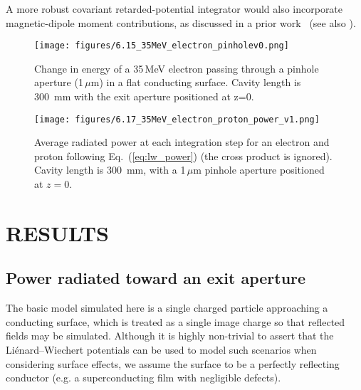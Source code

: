 \documentclass[reprint,
               amsmath,amssymb,nofootinbib, aps%
              ]{revtex4-2}
\begin{document}
A more robust covariant retarded-potential integrator would also incorporate magnetic-dipole moment contributions, as discussed in a prior work~\cite{folsom:ipac2021-tupab218} (see also \cite{steinmetzMagneticDipoleMoment2019a}).

\begin{figure}[ht!]
    \centering
    \texttt{[image: figures/6.15\_35MeV\_electron\_pinholev0.png]}
    \caption{Change in energy of a 35\,MeV electron passing through a pinhole aperture (1\,$\mu$m) in a flat conducting surface. Cavity length is 300~mm with the exit aperture positioned at z=0.}
\label{fig:e_dep_35_MeV_elec}
\end{figure}

\begin{figure}[ht!]
    \centering
    \texttt{[image: figures/6.17\_35MeV\_electron\_proton\_power\_v1.png]}
    \caption{Average radiated power at each integration step for an electron and proton following Eq.~(\ref{eq:lw_power}) (the cross product is ignored). Cavity length is 300~mm, with a 1\,$\mu$m pinhole aperture positioned at $z=0$.}
\label{fig:pow_dep_elec_prot}
\end{figure}

\vspace{-0.2cm}
\section{RESULTS} \label{results}
\vspace{-0.2cm}
\subsection{Power radiated toward an exit aperture}
The basic model simulated here is a single charged particle approaching a conducting surface, which is treated as a single image charge so that reflected fields may be simulated. Although it is highly non-trivial to assert that the Liénard--Wiechert potentials can be used to model such scenarios when considering surface effects, we assume the surface to be a perfectly reflecting conductor (e.g. a superconducting film with negligible defects).
\end{document}
